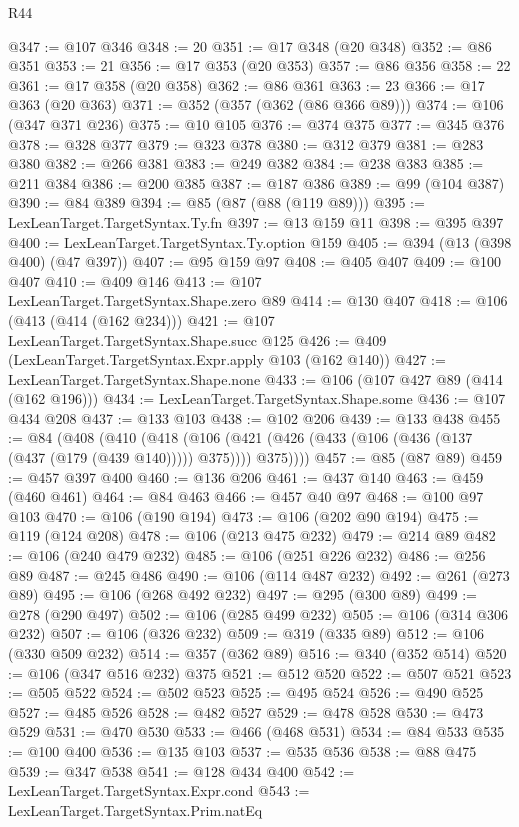 \begin{lexlean}{R44}
\begin{coremodule}
@347 := @107 @346
@348 := 20
@351 := @17 @348 (@20 @348)
@352 := @86 @351
@353 := 21
@356 := @17 @353 (@20 @353)
@357 := @86 @356
@358 := 22
@361 := @17 @358 (@20 @358)
@362 := @86 @361
@363 := 23
@366 := @17 @363 (@20 @363)
@371 := @352 (@357 (@362 (@86 @366 @89)))
@374 := @106 (@347 @371 @236)
@375 := @10 @105
@376 := @374 @375
@377 := @345 @376
@378 := @328 @377
@379 := @323 @378
@380 := @312 @379
@381 := @283 @380
@382 := @266 @381
@383 := @249 @382
@384 := @238 @383
@385 := @211 @384
@386 := @200 @385
@387 := @187 @386
@389 := @99 (@104 @387)
@390 := @84 @389
@394 := @85 (@87 (@88 (@119 @89)))
@395 := LexLeanTarget.TargetSyntax.Ty.fn
@397 := @13 @159 @11
@398 := @395 @397
@400 := LexLeanTarget.TargetSyntax.Ty.option @159
@405 := @394 (@13 (@398 @400) (@47 @397))
@407 := @95 @159 @97
@408 := @405 @407
@409 := @100 @407
@410 := @409 @146
@413 := @107 LexLeanTarget.TargetSyntax.Shape.zero @89
@414 := @130 @407
@418 := @106 (@413 (@414 (@162 @234)))
@421 := @107 LexLeanTarget.TargetSyntax.Shape.succ @125
@426 := @409 (LexLeanTarget.TargetSyntax.Expr.apply @103 (@162 @140))
@427 := LexLeanTarget.TargetSyntax.Shape.none
@433 := @106 (@107 @427 @89 (@414 (@162 @196)))
@434 := LexLeanTarget.TargetSyntax.Shape.some
@436 := @107 @434 @208
@437 := @133 @103
@438 := @102 @206
@439 := @133 @438
@455 := @84
    (@408
      (@410
        (@418
          (@106 (@421 (@426 (@433 (@106 (@436 (@137 (@437 (@179 (@439 @140))))) @375)))) @375))))
@457 := @85 (@87 @89)
@459 := @457 @397 @400
@460 := @136 @206
@461 := @437 @140
@463 := @459 (@460 @461)
@464 := @84 @463
@466 := @457 @40 @97
@468 := @100 @97 @103
@470 := @106 (@190 @194)
@473 := @106 (@202 @90 @194)
@475 := @119 (@124 @208)
@478 := @106 (@213 @475 @232)
@479 := @214 @89
@482 := @106 (@240 @479 @232)
@485 := @106 (@251 @226 @232)
@486 := @256 @89
@487 := @245 @486
@490 := @106 (@114 @487 @232)
@492 := @261 (@273 @89)
@495 := @106 (@268 @492 @232)
@497 := @295 (@300 @89)
@499 := @278 (@290 @497)
@502 := @106 (@285 @499 @232)
@505 := @106 (@314 @306 @232)
@507 := @106 (@326 @232)
@509 := @319 (@335 @89)
@512 := @106 (@330 @509 @232)
@514 := @357 (@362 @89)
@516 := @340 (@352 @514)
@520 := @106 (@347 @516 @232) @375
@521 := @512 @520
@522 := @507 @521
@523 := @505 @522
@524 := @502 @523
@525 := @495 @524
@526 := @490 @525
@527 := @485 @526
@528 := @482 @527
@529 := @478 @528
@530 := @473 @529
@531 := @470 @530
@533 := @466 (@468 @531)
@534 := @84 @533
@535 := @100 @400
@536 := @135 @103
@537 := @535 @536
@538 := @88 @475
@539 := @347 @538
@541 := @128 @434 @400
@542 := LexLeanTarget.TargetSyntax.Expr.cond
@543 := LexLeanTarget.TargetSyntax.Prim.natEq

\end{coremodule}
\end{lexlean}
